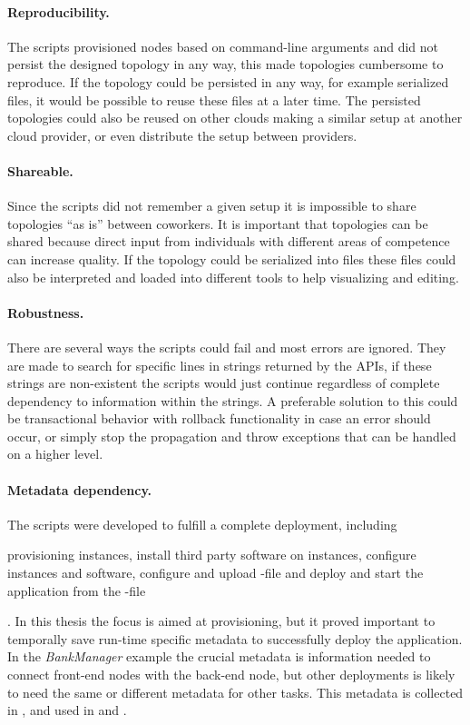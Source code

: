 \paragraph{Reproducibility.}

The scripts provisioned nodes based on command-line arguments
and did not persist the designed topology in any way, 
this made topologies cumbersome to reproduce.
If the topology could be persisted in any way, for example serialized files,
it would be possible to reuse these files at a later time.
The persisted topologies could also be reused on other clouds making a 
similar setup at another cloud provider, or even distribute the setup
between providers.

\paragraph{Shareable.}

Since the scripts did not remember a given setup it is impossible 
to share topologies ``as is'' between coworkers.
It is important that topologies can be shared because direct input from individuals
with different areas of competence can increase quality.
If the topology could be serialized into files these files could also be interpreted
and loaded into different tools to help visualizing and editing.

\paragraph{Robustness.}

There are several ways the scripts could fail and most errors are ignored.
They are made to search for specific lines in strings returned by the APIs,
if these strings are non-existent the scripts would just continue regardless
of complete dependency to information within the strings.
A preferable solution to this could be transactional behavior with rollback functionality
in case an error should occur, or simply stop the propagation
and throw exceptions that can be handled on a higher level.

\paragraph{Metadata dependency.}

The scripts were developed to fulfill a complete deployment,
including 
\begin{ii}
  \iitem provisioning instances, 
  \iitem install third party software on instances,
  \iitem configure instances and software,
  \iitem configure and upload -file and
  \iitem deploy and start the application from the -file
\end{ii}.
In this thesis the focus is aimed at provisioning, but it proved important to temporally 
save run-time specific metadata to successfully deploy the application.
In the \emph{BankManager} example the crucial metadata is information needed to connect 
front-end nodes with the back-end node, but other deployments is likely to need the same 
or different metadata for other tasks.
This metadata is collected in , and used in  and .
